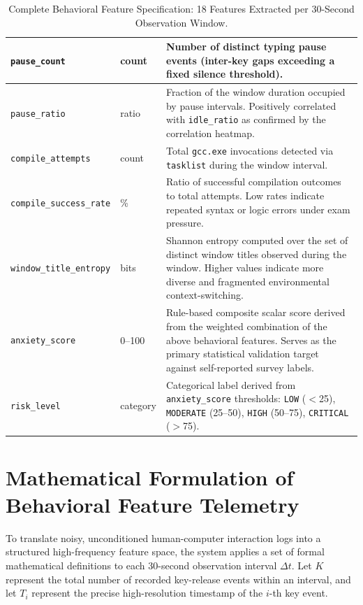 \begin{table}[htbp]
\begin{tabular}{|p{}|p{}|p{}|}
        \texttt{pause\_count} & count & Number of distinct typing pause events (inter-key gaps exceeding a fixed silence threshold). \\ \hline
        \texttt{pause\_ratio} & ratio & Fraction of the window duration occupied by pause intervals. Positively correlated with \texttt{idle\_ratio} as confirmed by the correlation heatmap. \\ \hline
        \texttt{compile\_attempts} & count & Total \texttt{gcc.exe} invocations detected via \texttt{tasklist} during the window interval. \\ \hline
        \texttt{compile\_success\_rate} & \% & Ratio of successful compilation outcomes to total attempts. Low rates indicate repeated syntax or logic errors under exam pressure. \\ \hline
        \texttt{window\_title\_entropy} & bits & Shannon entropy computed over the set of distinct window titles observed during the window. Higher values indicate more diverse and fragmented environmental context-switching. \\ \hline
        \texttt{anxiety\_score} & 0--100 & Rule-based composite scalar score derived from the weighted combination of the above behavioral features. Serves as the primary statistical validation target against self-reported survey labels. \\ \hline
        \texttt{risk\_level} & category & Categorical label derived from \texttt{anxiety\_score} thresholds: \texttt{LOW} ($<$25), \texttt{MODERATE} (25--50), \texttt{HIGH} (50--75), \texttt{CRITICAL} ($>$75). \\ \hline
    \end{tabular}
    \caption{Complete Behavioral Feature Specification: 18 Features Extracted per 30-Second Observation Window.}
    \label{tab:features}
\end{table}

\section[Mathematical Formulation of Features]{Mathematical Formulation of Behavioral Feature Telemetry}
\label{sec:math}

To translate noisy, unconditioned human-computer interaction logs into a structured high-frequency feature space, the system applies a set of formal mathematical definitions to each 30-second observation interval $\Delta t$. Let $K$ represent the total number of recorded key-release events within an interval, and let $T_i$ represent the precise high-resolution timestamp of the $i$-th key event.

